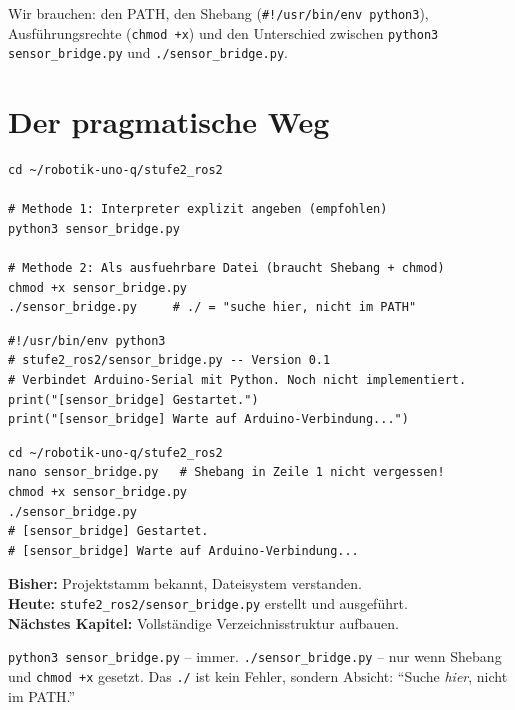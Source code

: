 \begin{wissenBox}
Wir brauchen: den PATH, den Shebang (\texttt{\#!/usr/bin/env python3}),
Ausführungsrechte (\texttt{chmod +x}) und den Unterschied zwischen
\texttt{python3 sensor\_bridge.py} und \texttt{./sensor\_bridge.py}.
\end{wissenBox}

\section{Der pragmatische Weg}

\begin{lstlisting}[style=bash]
cd ~/robotik-uno-q/stufe2_ros2

# Methode 1: Interpreter explizit angeben (empfohlen)
python3 sensor_bridge.py

# Methode 2: Als ausfuehrbare Datei (braucht Shebang + chmod)
chmod +x sensor_bridge.py
./sensor_bridge.py     # ./ = "suche hier, nicht im PATH"
\end{lstlisting}

\begin{lstlisting}[style=python]
#!/usr/bin/env python3
# stufe2_ros2/sensor_bridge.py -- Version 0.1
# Verbindet Arduino-Serial mit Python. Noch nicht implementiert.
print("[sensor_bridge] Gestartet.")
print("[sensor_bridge] Warte auf Arduino-Verbindung...")
\end{lstlisting}

\begin{loesungBox}
\begin{lstlisting}[style=bash]
cd ~/robotik-uno-q/stufe2_ros2
nano sensor_bridge.py   # Shebang in Zeile 1 nicht vergessen!
chmod +x sensor_bridge.py
./sensor_bridge.py
# [sensor_bridge] Gestartet.
# [sensor_bridge] Warte auf Arduino-Verbindung...
\end{lstlisting}
\end{loesungBox}

\begin{projektBox}
\textbf{Bisher:} Projektstamm bekannt, Dateisystem verstanden.\\
\textbf{Heute:} \texttt{stufe2\_ros2/sensor\_bridge.py} erstellt
und ausgeführt.\\
\textbf{Nächstes Kapitel:} Vollständige Verzeichnisstruktur aufbauen.
\end{projektBox}

\begin{merksatzBox}
\texttt{python3 sensor\_bridge.py} -- immer.
\texttt{./sensor\_bridge.py} -- nur wenn Shebang und
\texttt{chmod +x} gesetzt. Das \texttt{./} ist kein Fehler,
sondern Absicht: \enquote{Suche \emph{hier}, nicht im PATH.}
\end{merksatzBox}

